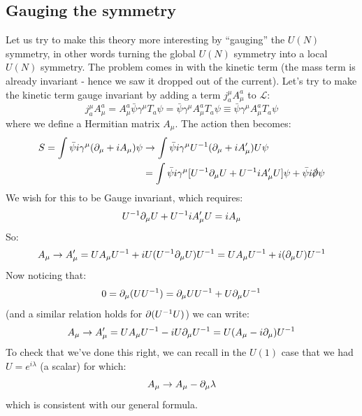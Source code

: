 \subsection{Gauging the symmetry}
Let us try to make this theory more interesting by ``gauging'' the $U(N)$ symmetry, in other words turning the global $U(N)$ symmetry into a local $U(N)$ symmetry. The problem comes in with the kinetic term (the mass term is already invariant - hence we saw it dropped out of the current). Let's try to make the kinetic term gauge invariant by adding a term $j^\mu_a A^a_\mu$ to $\mathcal{L}$:
\begin{equation}
    j^\mu_a A^a_\mu = A_\mu^a \bar{\psi}\gamma^\mu T_a \psi = \bar{\psi}\gamma^\mu A^a_\mu T_a \psi \equiv \bar{\psi}\gamma^\mu A_\mu^a T_a \psi
\end{equation}
where we define a Hermitian matrix $A_\mu$. The action then becomes:
\begin{equation}
    \begin{split}
        S = \int \bar{\psi}i\gamma^\mu(\p_\mu + iA_\mu)\psi &\to \int \bar{\psi}i\gamma^\mu U^{-1} (\p_\mu + iA_\mu')U\psi
        \\ &= \int \bar{\psi}i\gamma^\mu [U^{-1}\p_\mu U + U^{-1} i A_\mu' U]\psi + \bar{\psi}i\slashed{\p}\psi
    \end{split}
\end{equation}
We wish for this to be Gauge invariant, which requires:
\begin{equation}
    U^{-1}\partial_\mu U + U^{-1} i A_\mu' U = iA_\mu
\end{equation}
So:
\begin{equation}
    A_\mu \to A_\mu' = UA_\mu U^{-1} + iU(U^{-1}\partial_\mu U)U^{-1} = UA_\mu U^{-1} + i(\partial_\mu U)U^{-1}
\end{equation}
Now noticing that:
\begin{equation}
    0 = \partial_\mu(UU^{-1}) = \partial_\mu U U^{-1} + U\partial_\mu U^{-1}
\end{equation}
(and a similar relation holds for $\partial(U^{-1}U)$) we can write:
\begin{equation}
    A_\mu \to A_\mu' = UA_\mu U^{-1} - iU\partial_\mu U^{-1} = U(A_\mu - i\partial_\mu)U^{-1}
\end{equation}
To check that we've done this right, we can recall in the $U(1)$ case that we had $U = e^{i\lambda}$ (a scalar) for which:
\begin{equation}
    A_\mu \to A_\mu - \partial_\mu \lambda
\end{equation}
which is consistent with our general formula.

